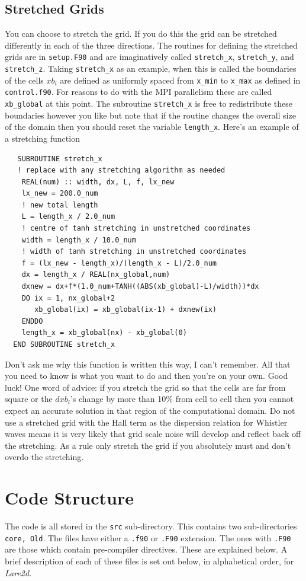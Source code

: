\documentclass[11pt]{article}
\begin{document}
\subsection{Stretched Grids}
You can choose to stretch the grid. If you do this the grid can be stretched differently in each of the three directions. The routines for defining the stretched grids are in \texttt{setup.F90} and are imaginatively called \texttt{stretch\_x}, \texttt{stretch\_y}, and \texttt{stretch\_z}. Taking \texttt{stretch\_x} as an example, when this is called the boundaries of the cells
$xb_i$ are defined as uniformly spaced from \texttt{x\_min} to \texttt{x\_max} as defined in \texttt{control.f90}. For reasons to do with the MPI parallelism these are called \texttt{xb\_global} at this point. The subroutine \texttt{stretch\_x} is free to redistribute these boundaries however you like but note that if the routine changes the overall size of the domain then you should reset the variable \texttt{length\_x}. Here's an example of a stretching function
\begin{verbatim}
   SUBROUTINE stretch_x
   ! replace with any stretching algorithm as needed
    REAL(num) :: width, dx, L, f, lx_new
    lx_new = 200.0_num
    ! new total length
    L = length_x / 2.0_num
    ! centre of tanh stretching in unstretched coordinates
    width = length_x / 10.0_num
    ! width of tanh stretching in unstretched coordinates
    f = (lx_new - length_x)/(length_x - L)/2.0_num
    dx = length_x / REAL(nx_global,num)
    dxnew = dx+f*(1.0_num+TANH((ABS(xb_global)-L)/width))*dx
    DO ix = 1, nx_global+2
       xb_global(ix) = xb_global(ix-1) + dxnew(ix)
    ENDDO
    length_x = xb_global(nx) - xb_global(0)
  END SUBROUTINE stretch_x
\end{verbatim}
Don't ask me why this function is written this way, I can't remember. All that you need to know is what you want to do and then you're on your own. Good luck! One word of advice: if you stretch the grid so that the cells are far from square or the $dxb_i$'s change by more than 10\% from cell to cell then you cannot expect an accurate solution in that region of the computational domain. Do not use a stretched grid with the Hall term as the dispersion relation for Whistler waves means it is very likely that grid scale noise will develop and reflect back off the stretching. As a rule only stretch the grid if you absolutely must and don't overdo the stretching.

\section{Code Structure}
The code is all stored in the \texttt{src} sub-directory. This contains two sub-directories \texttt{core, Old}. The files have either a \texttt{.f90} or \texttt{.F90} extension. The ones with \texttt{.F90} are those which contain pre-compiler directives. These are explained below. A brief description of each of these files is set out below, in alphabetical order, for {\it Lare2d}.
\end{document}
